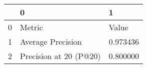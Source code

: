 \begin{tabular}{lll}
\toprule
 & 0 & 1 \\
\midrule
0 & Metric & Value \\
1 & Average Precision & 0.973436 \\
2 & Precision at 20 (P@20) & 0.800000 \\
\bottomrule
\end{tabular}
